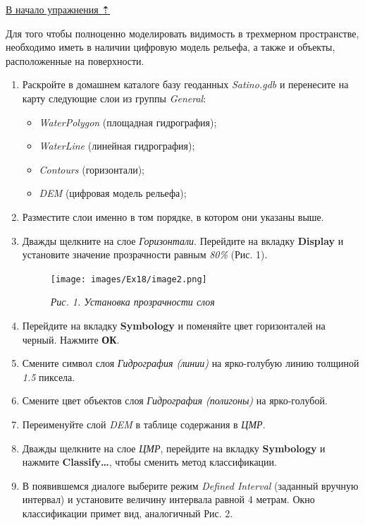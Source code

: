 \documentclass[12pt,]{book}
\providecommand{\tightlist}{%
  \setlength{\itemsep}{0pt}\setlength{\parskip}{0pt}}
\begin{document}
\protect\hyperlink{threed-modelling}{В начало упражнения ⇡}

Для того чтобы полноценно моделировать видимость в трехмерном пространстве, необходимо иметь в наличии цифровую модель рельефа, а также и объекты, расположенные на поверхности.

\begin{enumerate}
\def\labelenumi{\arabic{enumi}.}
\item
  Раскройте в домашнем каталоге базу геоданных \emph{Satino.gdb} и перенесите на карту следующие слои из группы \emph{General}:

  \begin{itemize}
  \tightlist
  \item
    \emph{WaterPolygon} (площадная гидрография);
  \item
    \emph{WaterLine} (линейная гидрография);
  \item
    \emph{Contours} (горизонтали);
  \item
    \emph{DEM} (цифровая модель рельефа);
  \end{itemize}
\item
  Разместите слои именно в том порядке, в котором они указаны выше.
\item
  Дважды щелкните на слое \emph{Горизонтали}. Перейдите на вкладку \textbf{Display} и установите значение прозрачности равным \emph{80\%} (Рис. 1).

  \begin{figure}
  \centering
  \texttt{[image: images/Ex18/image2.png]}
  \caption{\emph{Рис. 1. Установка прозрачности слоя}}
  \end{figure}
\item
  Перейдите на вкладку \textbf{Symbology} и поменяйте цвет горизонталей на черный. Нажмите \textbf{ОК}.
\item
  Смените символ слоя \emph{Гидрография (линии)} на ярко-голубую линию толщиной \emph{1.5} пиксела.
\item
  Смените цвет объектов слоя \emph{Гидрография (полигоны)} на ярко-голубой.
\item
  Переименуйте слой \emph{DEM} в таблице содержания в \emph{ЦМР}.
\item
  Дважды щелкните на слое \emph{ЦМР}, перейдите на вкладку \textbf{Symbology} и нажмите \textbf{Classify\ldots{}}, чтобы сменить метод классификации.
\item
  В появившемся диалоге выберите режим \emph{Defined Interval} (заданный вручную интервал) и установите величину интервала равной 4 метрам. Окно классификации примет вид, аналогичный Рис. 2.


\end{enumerate}
\end{document}
